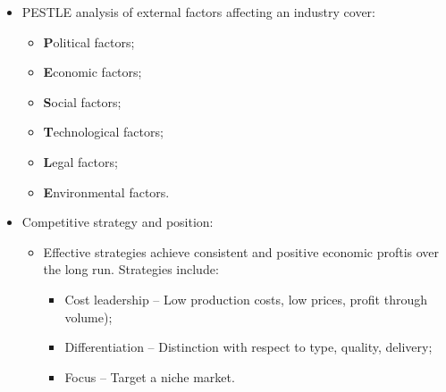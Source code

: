 \documentclass[../notes_compiled.tex]{subfiles}
\begin{document}
\begin{itemize}
\begin{itemize}
\begin{enumerate}
\item Intensity of rivalry;
\item Bargaining power of suppliers;
\item Bargaining power of customers;
\item Threat of new entrants; 
\end{enumerate}
and are used to determine the intensity of industry competition.
\end{itemize}
\item PESTLE analysis of external factors affecting an industry cover:
\begin{itemize}
\item \textbf{P}olitical factors;
\item \textbf{E}conomic factors;
\item \textbf{S}ocial factors;
\item \textbf{T}echnological factors;
\item \textbf{L}egal factors;
\item \textbf{E}nvironmental factors.
\end{itemize}
\item Competitive strategy and position:
\begin{itemize}
\item Effective strategies achieve consistent and positive economic proftis over the long run. Strategies include:
\begin{itemize}
\item Cost leadership -- Low production costs, low prices, profit through volume);
\item Differentiation -- Distinction with respect to type, quality, delivery;
\item Focus -- Target a niche market.
\end{itemize}
\end{itemize}
\end{itemize}
\end{document}
